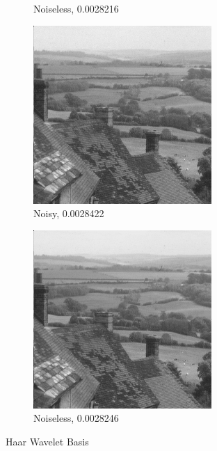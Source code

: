 \documentclass[a4paper]{article}
\begin{document}
\begin{figure}[H]
\begin{subfigure}{0.24\linewidth}
        \caption{Noiseless, 0.0028216}
    \end{subfigure}
    \begin{subfigure}{0.24\linewidth}
        \centering
        \includegraphics[width = \linewidth]{haarWavelet/goldhill reconstructed using all measurements, with noise.png}
        \caption{Noisy, 0.0028422}
    \end{subfigure}
    \begin{subfigure}{0.24\linewidth}
        \centering
        \includegraphics[width = \linewidth]{haarWavelet/goldhill reconstructed using all measurements, without noise.png}
        \caption{Noiseless, 0.0028246}
    \end{subfigure}
    \caption{Haar Wavelet Basis}
    \label{fig:hwa}
\end{figure}
\clearpage
\end{document}
